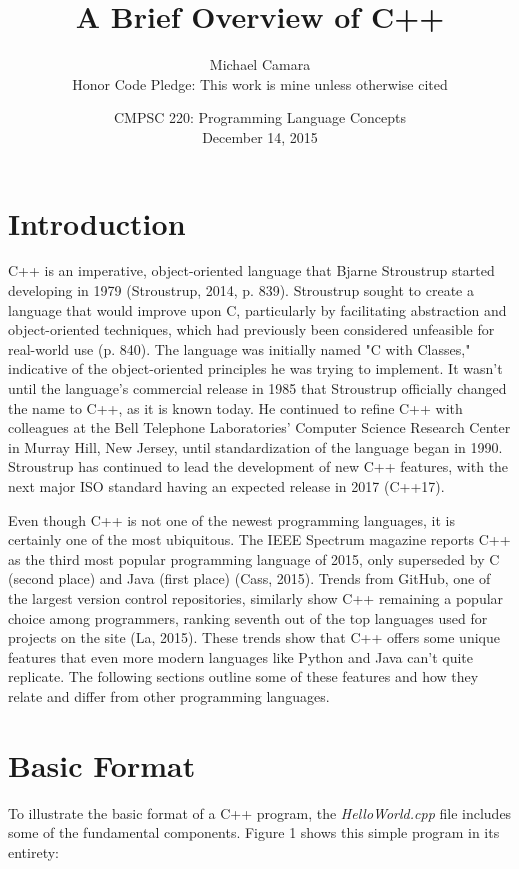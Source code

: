 \documentclass[11pt]{article}
\begin{document}
\title{A Brief Overview of C++}
\author{Michael Camara\\Honor Code Pledge: This work is mine unless otherwise cited}
\date{CMPSC 220: Programming Language Concepts\\December 14, 2015}

\maketitle

\section{Introduction}

	C++ is an imperative, object-oriented language that Bjarne Stroustrup started developing in 1979 (Stroustrup, 2014, p. 839).  Stroustrup sought to create a language that would improve upon C, particularly by facilitating abstraction and object-oriented techniques, which had previously been considered unfeasible for real-world use (p. 840).  The language was initially named "C with Classes," indicative of the object-oriented principles he was trying to implement.  It wasn't until the language's commercial release in 1985 that Stroustrup officially changed the name to C++, as it is known today.  He continued to refine C++ with colleagues at the Bell Telephone Laboratories' Computer Science Research Center in Murray Hill, New Jersey, until standardization of the language began in 1990.  Stroustrup has continued to lead the development of new C++ features, with the next major ISO standard having an expected release in 2017 (C++17).

	Even though C++ is not one of the newest programming languages, it is certainly one of the most ubiquitous.  The IEEE Spectrum magazine reports C++ as the third most popular programming language of 2015, only superseded by C (second place) and Java (first place) (Cass, 2015).  Trends from GitHub, one of the largest version control repositories, similarly show C++ remaining a popular choice among programmers, ranking seventh out of the top languages used for projects on the site (La, 2015).  These trends show that C++ offers some unique features that even more modern languages like Python and Java can't quite replicate.  The following sections outline some of these features and how they relate and differ from other programming languages.

\section{Basic Format}
	To illustrate the basic format of a C++ program, the \textit{HelloWorld.cpp} file includes some of the fundamental components.  Figure 1 shows this simple program in its entirety:
\end{document}
